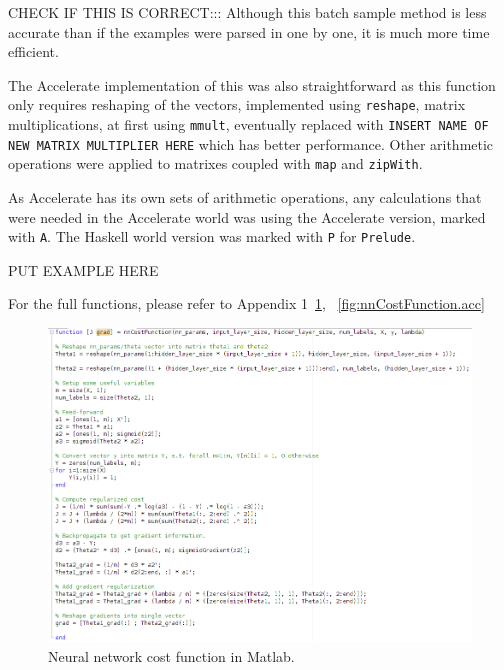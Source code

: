 CHECK IF THIS IS CORRECT::: Although this batch sample method is less accurate than if the examples were parsed in one by one, it is much more time efficient.

The Accelerate implementation of this was also straightforward as this function only requires reshaping of the vectors, implemented using \texttt{reshape}, matrix multiplications, at first using \texttt{mmult}, eventually replaced with \texttt{INSERT NAME OF NEW MATRIX MULTIPLIER HERE} which has better performance. Other arithmetic operations were applied to matrixes coupled with \texttt{map} and \texttt{zipWith}.

As Accelerate has its own sets of arithmetic operations, any calculations that were needed in the Accelerate world was using the Accelerate version, marked with \texttt{A}. The Haskell world version was marked with \texttt{P} for \texttt{Prelude}.

PUT EXAMPLE HERE 

For the full functions, please refer to Appendix 1~\ref{fig:nnCostFunction.matlab}, ~\ref{fig:nnCostFunction.acc}

\begin{figure}
	\centerline{\includegraphics[width=\linewidth]{nnCostFunction-matlab.png}}
	\caption{Neural network cost function in Matlab.}
	\label{fig:nnCostFunction.matlab}
\end{figure}


